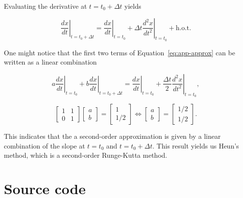 \documentclass[11pt,titlepage]{report}
\begin{document}
\begin{appendices}
Evaluating the derivative at $t=t_0+\Delta t$ yields

\begin{equation}
	\left. \frac{dx}{dt} \right|_{t=t_0+\Delta t} = 
		\left. \frac{dx}{dt} \right|_{t=t_0} +
		\Delta t \left. \frac{d^2x}{dt^2} \right|_{t=t_0} +
		\text{h.o.t.}
\end{equation}

One might notice that the first two terms of Equation~\ref{eq:app-approx} can be written as a linear combination

\begin{equation}
	a \left. \frac{dx}{dt} \right|_{t=t_0} +
	b \left. \frac{dx}{dt} \right|_{t=t_0+\Delta t} =
		\left. \frac{dx}{dt} \right|_{t=t_0}+
		\frac{\Delta t}{2}\left. \frac{d^2x}{dt^2} \right|_{t=t_0},
\end{equation}

\begin{equation}
	\begin{bmatrix}
		1 & 1 \\
		0 & 1 
	\end{bmatrix} \begin{bmatrix}
		a \\
		b 
	\end{bmatrix} = \begin{bmatrix}
		1 \\
		1/2
	\end{bmatrix} \Leftrightarrow \begin{bmatrix}
		a \\
		b
	\end{bmatrix} = \begin{bmatrix}
		1/2 \\ 
		1/2
	\end{bmatrix}.
\end{equation}

This indicates that the a second-order approximation is given by a linear combination of the slope at $t=t_0$ and $t=t_0+\Delta t$. This result yields us Heun's method, which is a second-order Runge-Kutta method. 

\chapter{Source code}

\end{appendices}
\end{document}
